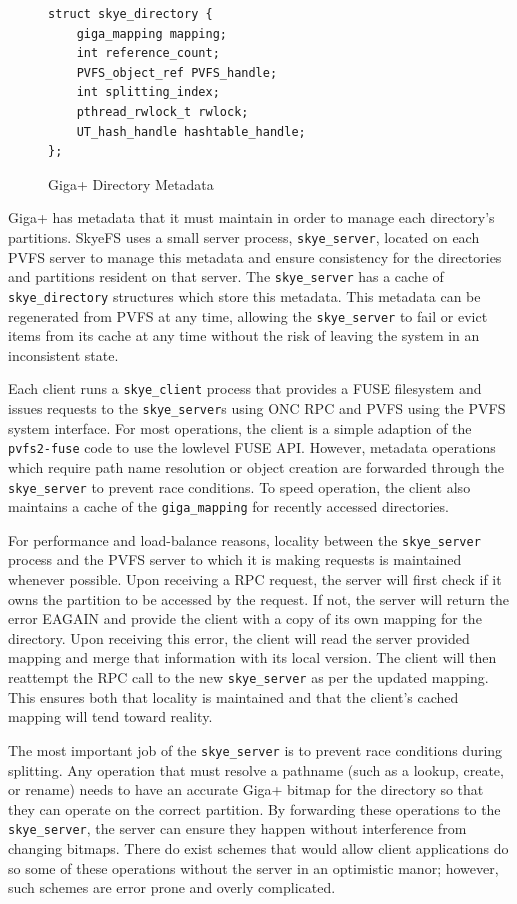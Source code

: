 \documentclass[twocolumn,letterpaper]{article}
\newcommand{\code}[1]{\texttt{#1}}
\begin{document}
\begin{figure}
\begin{lstlisting}
struct skye_directory {
    giga_mapping mapping;
    int reference_count;
    PVFS_object_ref PVFS_handle;
    int splitting_index;
    pthread_rwlock_t rwlock;
    UT_hash_handle hashtable_handle;
};
\end{lstlisting}
\caption{Giga+ Directory Metadata}
\label{fig:skyedir}
\end{figure}

Giga+ has metadata that it must maintain in order to manage each directory's
partitions.  SkyeFS uses a small server process, \code{skye\_server}, located
on each PVFS server to manage this metadata and ensure consistency for the
directories and partitions resident on that server.  The \code{skye\_server}
has a cache of \code{skye\_directory} structures which store this metadata.
This metadata can be regenerated from PVFS at any time, allowing the
\code{skye\_server} to fail or evict items from its cache at any time without
the risk of leaving the system in an inconsistent state.

Each client runs a \code{skye\_client} process that provides a FUSE filesystem
and issues requests to the \code{skye\_server}s using ONC RPC and PVFS using
the PVFS system interface.  For most operations, the client is a simple
adaption of the \code{pvfs2-fuse} code to use the lowlevel FUSE API.  However,
metadata operations which require path name resolution or object creation are
forwarded through the \code{skye\_server} to prevent race conditions.  To
speed operation, the client also maintains a cache of the \code{giga\_mapping}
for recently accessed directories.

For performance and load-balance reasons, locality between the
\code{skye\_\-server} process and the PVFS server to which it is making
requests is maintained whenever possible.  Upon receiving a RPC request, the
server will first check if it owns the partition to be accessed by the
request.  If not, the server will return the error EAGAIN and provide
the client with a copy of its own mapping for the directory.  Upon receiving
this error, the client will read the server provided mapping and merge that
information with its local version.  The client will then reattempt the RPC
call to the new \code{skye\_\-server} as per the updated mapping.  This
ensures both that locality is maintained and that the client's cached mapping
will tend toward reality.

The most important job of the \code{skye\_server} is to prevent race
conditions during splitting.  Any operation that must resolve a pathname (such
as a lookup, create, or rename) needs to have an accurate Giga+ bitmap for the
directory so that they can operate on the correct partition.  By forwarding
these operations to the \code{skye\_server}, the server can ensure they happen
without interference from changing bitmaps.  There do exist schemes that would
allow client applications do so some of these operations without the server in
an optimistic manor; however, such schemes are error prone and overly
complicated.
\end{document}
